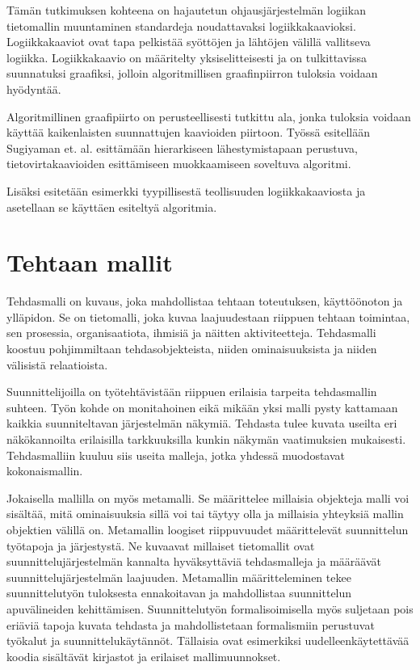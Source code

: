 \documentclass[finnish,12pt]{article}
\begin{document}
Tämän tutkimuksen kohteena on hajautetun ohjausjärjestelmän logiikan
tietomallin muuntaminen standardeja noudattavaksi logiikkakaavioksi.
Logiikkakaaviot ovat tapa pelkistää syöttöjen ja lähtöjen välillä vallitseva
logiikka. Logiikkakaavio on määritelty yksiselitteisesti ja on tulkittavissa
suunnatuksi graafiksi, jolloin algoritmillisen graafinpiirron tuloksia voidaan
hyödyntää.

Algoritmillinen graafipiirto on perusteellisesti tutkittu ala, jonka tuloksia
voidaan käyttää kaikenlaisten suunnattujen kaavioiden piirtoon. Työssä esitellään
Sugiyaman et. al. \cite{RefWorks:9} esittämään hierarkiseen lähestymistapaan
perustuva, tietovirtakaavioiden esittämiseen muokkaamiseen soveltuva algoritmi.

Lisäksi esitetään esimerkki tyypillisestä teollisuuden logiikkakaaviosta ja asetellaan se
käyttäen esiteltyä algoritmia.

	\clearpage
	\section{Tehtaan mallit}

Tehdasmalli on kuvaus, joka mahdollistaa tehtaan toteutuksen, käyttöönoton ja
ylläpidon. Se on tietomalli, joka kuvaa laajuudestaan riippuen tehtaan toimintaa,
sen prosessia, organisaatiota, ihmisiä ja näitten aktiviteetteja. Tehdasmalli
koostuu pohjimmiltaan tehdasobjekteista, niiden ominaisuuksista ja niiden
välisistä relaatioista. \cite{RefWorks:41}

Suunnittelijoilla on työtehtävistään riippuen erilaisia tarpeita tehdasmallin
suhteen. Työn kohde on monitahoinen eikä mikään yksi malli pysty kattamaan
kaikkia suunniteltavan järjestelmän näkymiä. Tehdasta tulee kuvata useilta eri
näkökannoilta erilaisilla tarkkuuksilla kunkin näkymän vaatimuksien mukaisesti.
Tehdasmalliin kuuluu siis useita malleja, jotka yhdessä muodostavat kokonaismallin.

Jokaisella mallilla on myös metamalli. Se määrittelee millaisia objekteja malli voi sisältää, mitä ominaisuuksia sillä voi tai täytyy olla ja millaisia yhteyksiä mallin objektien välillä on.
Metamallin loogiset riippuvuudet määrittelevät suunnittelun työtapoja ja järjestystä.
Ne kuvaavat millaiset tietomallit ovat suunnittelujärjestelmän kannalta hyväksyttäviä tehdasmalleja ja
määräävät suunnittelujärjestelmän laajuuden. Metamallin määritteleminen tekee suunnittelutyön tuloksesta ennakoitavan ja mahdollistaa suunnittelun apuvälineiden kehittämisen. Suunnittelutyön formalisoimisella myös suljetaan pois eriäviä tapoja kuvata tehdasta ja mahdollistetaan formalismiin perustuvat työkalut ja suunnittelukäytännöt. Tällaisia ovat esimerkiksi uudelleenkäytettävää koodia sisältävät kirjastot ja erilaiset mallimuunnokset.
\end{document}
